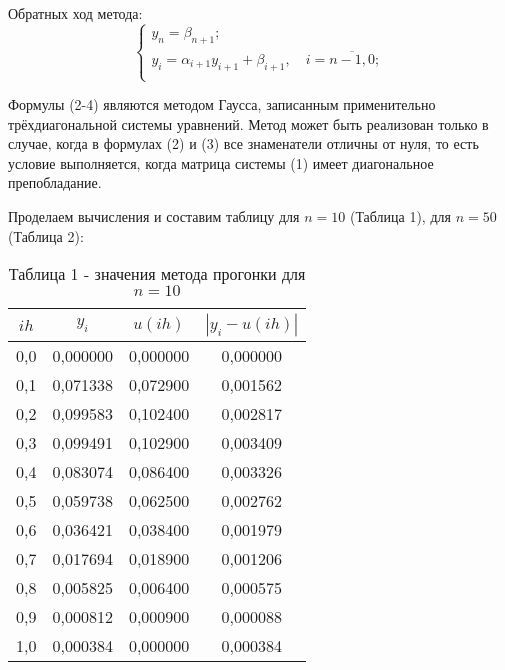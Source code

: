 \documentclass[a4paper,12pt]{article}
\begin{document}
{Обратных ход метода:
\begin{equation}
    \begin{cases}
        y_n = \beta_{n+1};\\
        y_i = \alpha_{i+1}y_{i+1} + \beta_{i+1}, \quad i = \overline{n-1, 0};\\
    \end{cases}
\end{equation}

Формулы (2-4) являются методом Гаусса, записанным применительно трёх\-диаго\-наль\-ной системы уравнений. 
Метод может быть реализован только в случае, когда в формулах (2) и (3) все знаменатели отличны от нуля, 
то есть условие выполняется, когда матрица системы (1) имеет диагональное препобладание.

Проделаем вычисления и составим таблицу для $n = 10$ (Таблица 1), для $n = 50$ (Таблица 2):
\begin{table}[h]
    \centering
    \begin{tabular}{|c|c|c|c|}
        \hline
        $ih$ & $y_i$ & $u(ih)$ & $\left|y_i - u(ih)\right|$\\
        \hline
        0,0 & 0,000000  & 0,000000  & 0,000000  \\           
        \hline
        0,1 & 0,071338  & 0,072900  & 0,001562  \\
        \hline
        0,2 & 0,099583  & 0,102400  & 0,002817  \\
        \hline
        0,3 & 0,099491  & 0,102900  & 0,003409  \\
        \hline
        0,4 & 0,083074  & 0,086400  & 0,003326  \\
        \hline
        0,5 & 0,059738  & 0,062500  & 0,002762  \\
        \hline
        0,6 & 0,036421  & 0,038400  & 0,001979  \\
        \hline
        0,7 & 0,017694  & 0,018900  & 0,001206  \\
        \hline
        0,8 & 0,005825  & 0,006400  & 0,000575  \\
        \hline
        0,9 & 0,000812  & 0,000900  & 0,000088  \\
        \hline
        1,0 & 0,000384  & 0,000000  & 0,000384  \\
        \hline
    \end{tabular}
    \caption*{\small{Таблица 1 - значения метода прогонки для $n = 10$}}
\end{table}
\clearpage
\begin{table}[h]

\end{table}}
\end{document}
